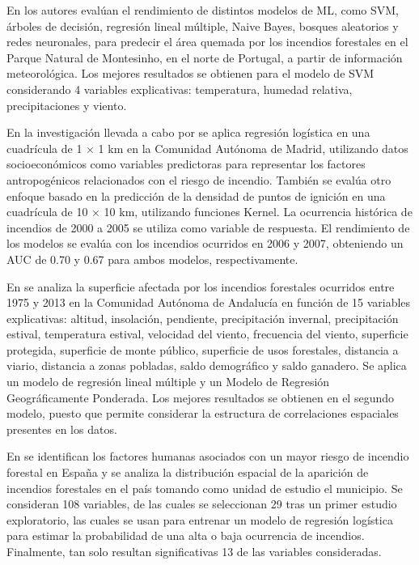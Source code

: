 \documentclass[12pt,a4paper,]{book}
\numberwithin{dummy}{section}
\theoremstyle{ocrenumbox}
\theoremstyle{blacknumex}
\theoremstyle{blacknumbox}
\theoremstyle{ocrenum}
\theoremstyle{ocrenum}
\begin{document}
En \citet{CortezMorais} los autores evalúan el rendimiento de distintos
modelos de ML, como SVM, árboles de decisión, regresión lineal múltiple,
Naive Bayes, bosques aleatorios y redes neuronales, para predecir el
área quemada por los incendios forestales en el Parque Natural de
Montesinho, en el norte de Portugal, a partir de información
meteorológica. Los mejores resultados se obtienen para el modelo de SVM
considerando 4 variables explicativas: temperatura, humedad relativa,
precipitaciones y viento.

En la investigación llevada a cabo por \citet{logreg_hcwf} se aplica
regresión logística en una cuadrícula de 1 × 1 km en la Comunidad
Autónoma de Madrid, utilizando datos socioeconómicos como variables
predictoras para representar los factores antropogénicos relacionados
con el riesgo de incendio. También se evalúa otro enfoque basado en la
predicción de la densidad de puntos de ignición en una cuadrícula de 10
× 10 km, utilizando funciones Kernel. La ocurrencia histórica de
incendios de 2000 a 2005 se utiliza como variable de respuesta. El
rendimiento de los modelos se evalúa con los incendios ocurridos en 2006
y 2007, obteniendo un AUC de 0.70 y 0.67 para ambos modelos,
respectivamente.

En \citet{incendiosAndalucia} se analiza la superficie afectada por los
incendios forestales ocurridos entre 1975 y 2013 en la Comunidad
Autónoma de Andalucía en función de 15 variables explicativas: altitud,
insolación, pendiente, precipitación invernal, precipitación estival,
temperatura estival, velocidad del viento, frecuencia del viento,
superficie protegida, superficie de monte público, superficie de usos
forestales, distancia a viario, distancia a zonas pobladas, saldo
demográfico y saldo ganadero. Se aplica un modelo de regresión lineal
múltiple y un Modelo de Regresión Geográficamente Ponderada. Los mejores
resultados se obtienen en el segundo modelo, puesto que permite
considerar la estructura de correlaciones espaciales presentes en los
datos.

En \citet{HumanCauseWildFiresSpain} se identifican los factores humanas
asociados con un mayor riesgo de incendio forestal en España y se
analiza la distribución espacial de la aparición de incendios forestales
en el país tomando como unidad de estudio el municipio. Se consideran
108 variables, de las cuales se seleccionan 29 tras un primer estudio
exploratorio, las cuales se usan para entrenar un modelo de regresión
logística para estimar la probabilidad de una alta o baja ocurrencia de
incendios. Finalmente, tan solo resultan significativas 13 de las
variables consideradas.
\end{document}
